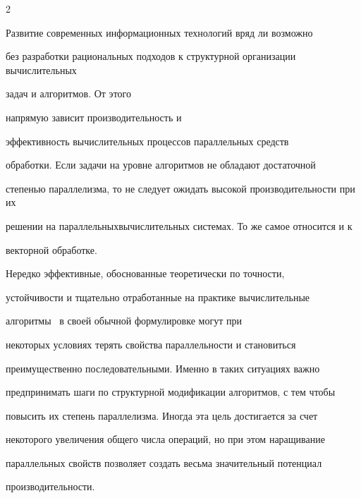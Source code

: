       \begin{multicols}{2}





      \label{st\stat}








     Развитие современных информационных технологий вряд ли возможно


без разработки рациональных подходов к структурной организации вычис\-ли\-тель\-ных 


задач и алгоритмов. От этого %


напрямую зависит производительность и 


эффективность вычислительных процессов параллельных средств 


обработки. Если задачи на уровне алгоритмов не обладают достаточной 


степенью параллелизма, то не следует ожидать высокой производительности при их 


решении на параллельных\linebreak вычислительных системах. То же самое относится и к 


векторной обработке.





     Нередко эффективные, обоснованные теоретически по точности,


устойчивости и тщательно отработанные на практике вычислительные


алгоритмы~\cite{1ol, 2ol} в своей обычной формулировке могут при


некоторых условиях терять свойства параллельности и становиться


преимущественно последовательными. Именно в таких ситуациях важно


предпринимать шаги по структурной модификации алгоритмов, с тем чтобы


повысить их степень параллелизма. Иногда эта цель достигается за счет


некоторого увеличения общего числа операций, но при этом наращивание


параллельных свойств позволяет создать весьма значительный потенциал


производительности.






\end{multicols}
